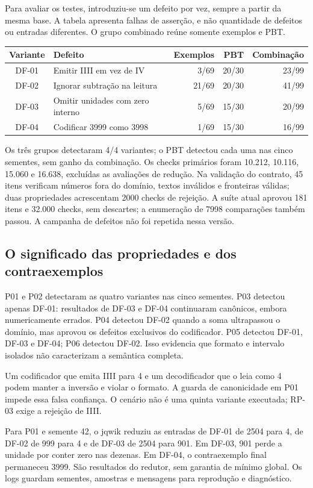 \documentclass[11pt,a4paper]{article}
\begin{document}
Para avaliar os testes, introduziu-se um defeito por vez, sempre a partir da mesma base. A tabela apresenta falhas de asserção, e não quantidade de defeitos ou entradas diferentes. O grupo combinado reúne somente exemplos e PBT.
\begin{center}
\small
\begin{tabular}{clrrr}
\toprule
Variante & Defeito & Exemplos & PBT & Combinação \\
\midrule
DF-01 & Emitir IIII em vez de IV & 3/69 & 20/30 & 23/99 \\
DF-02 & Ignorar subtração na leitura & 21/69 & 20/30 & 41/99 \\
DF-03 & Omitir unidades com zero interno & 5/69 & 15/30 & 20/99 \\
DF-04 & Codificar 3999 como 3998 & 1/69 & 15/30 & 16/99 \\
\bottomrule
\end{tabular}
\end{center}
Os três grupos detectaram 4/4 variantes; o PBT detectou cada uma nas cinco sementes, sem ganho da combinação. Os checks primários foram 10.212, 10.116, 15.060 e 16.638, excluídas as avaliações de redução. Na validação do contrato, 45 itens verificam números fora do domínio, textos inválidos e fronteiras válidas; duas propriedades acrescentam 2000 checks de rejeição. A suíte atual aprovou 181 itens e 32.000 checks, sem descartes; a enumeração de 7998 comparações também passou. A campanha de defeitos não foi repetida nessa versão.

\subsection{O significado das propriedades e dos contraexemplos}
P01 e P02 detectaram as quatro variantes nas cinco sementes. P03 detectou apenas DF-01: resultados de DF-03 e DF-04 continuaram canônicos, embora numericamente errados. P04 detectou DF-02 quando a soma ultrapassou o domínio, mas aprovou os defeitos exclusivos do codificador. P05 detectou DF-01, DF-03 e DF-04; P06 detectou DF-02. Isso evidencia que formato e intervalo isolados não caracterizam a semântica completa.

Um codificador que emita IIII para 4 e um decodificador que o leia como 4 podem manter a inversão e violar o formato. A guarda de canonicidade em P01 impede essa falsa confiança. O cenário não é uma quinta variante executada; RP-03 exige a rejeição de IIII.

Para P01 e semente 42, o jqwik reduziu as entradas de DF-01 de 2504 para 4, de DF-02 de 999 para 4 e de DF-03 de 2504 para 901. Em DF-03, 901 perde a unidade por conter zero nas dezenas. Em DF-04, o contraexemplo final permaneceu 3999. São resultados do redutor, sem garantia de mínimo global. Os logs guardam sementes, amostras e mensagens para reprodução e diagnóstico.
\end{document}
